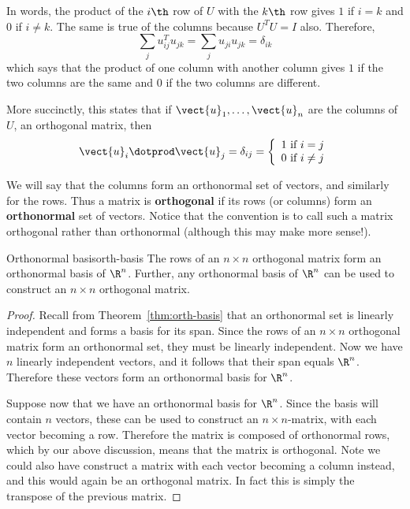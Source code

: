 In words, the product of the $i\th$ row of $U$ with the $k\th$ row
gives $1$ if $i=k$ and $0$ if $i\neq k$. The same is true of the columns because 
$U^{T}U=I$ also. Therefore, 
\begin{equation*}
\sum_{j}u_{ij}^{T}u_{jk}=\sum_{j}u_{ji}u_{jk}=\delta _{ik}
\end{equation*}
which says that the product of one column with another column gives $1$ if the two
columns are the same and $0$ if the two columns are different.

More succinctly, this states that if $\vect{u}_{1},\ldots,\vect{u}_{n}$
are the columns of $U$, an orthogonal matrix, then 
\[
\vect{u}_{i}\dotprod \vect{u}_{j}=\delta _{ij} = \left\{
\begin{array}{c}
1\text{ if }i=j \\ 
0\text{ if }i\neq j
\end{array}
\right.  
\]

We will say that the columns form an orthonormal set of vectors, and similarly for the rows. Thus a matrix is \textbf{orthogonal} if its rows (or columns) form an
\textbf{orthonormal} set of vectors. Notice that the convention is to call such a matrix orthogonal rather than orthonormal (although this may make more sense!). 

\begin{proposition}{Orthonormal basis}{orth-basis}
The rows of an $n \times n$ orthogonal matrix form an orthonormal
basis of $\R^n$. Further, any orthonormal basis of
$\R^n$ can be used to construct an $n \times n$ orthogonal
matrix.
\end{proposition}

\begin{proof}
Recall from Theorem~\ref{thm:orth-basis} that an orthonormal set is
linearly independent and forms a basis for its span. Since the rows of
an $n \times n$ orthogonal matrix form an orthonormal set, they must
be linearly independent. Now we have $n$ linearly independent vectors,
and it follows that their span equals $\R^n$. Therefore these
vectors form an orthonormal basis for $\R^n$.

Suppose now that we have an orthonormal basis for $\R^n$. Since the
basis will contain $n$ vectors, these can be used to construct an $n
\times n$-matrix, with each vector becoming a row. Therefore the
matrix is composed of orthonormal rows, which by our above discussion,
means that the matrix is orthogonal. Note we could also have construct
a matrix with each vector becoming a column instead, and this would
again be an orthogonal matrix. In fact this is simply the transpose of
the previous matrix.
\end{proof}

